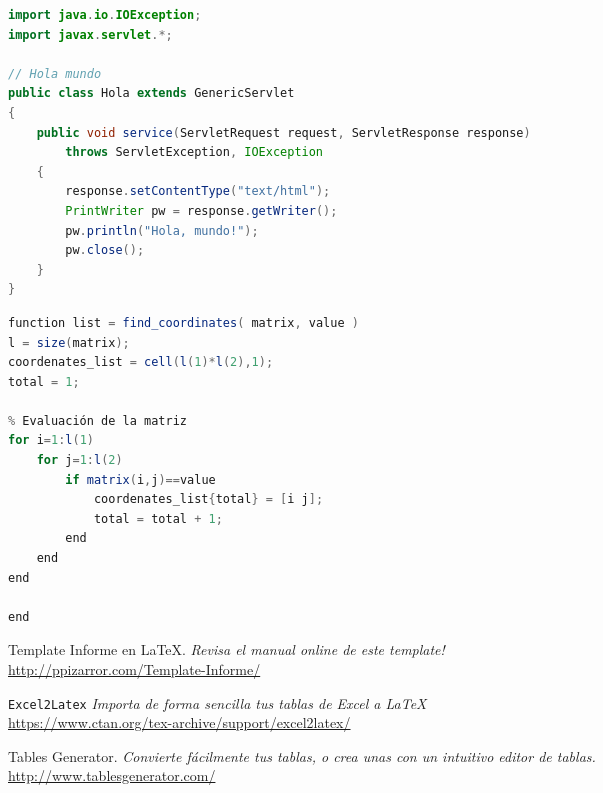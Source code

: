 \lstset{style=Java}
\begin{lstlisting}[language=Java, caption=Ejemplo en Java]
import java.io.IOException; 
import javax.servlet.*;

// Hola mundo
public class Hola extends GenericServlet 
{
    public void service(ServletRequest request, ServletResponse response)
        throws ServletException, IOException
    {
        response.setContentType("text/html");
        PrintWriter pw = response.getWriter();
        pw.println("Hola, mundo!");
        pw.close();
    }
}
\end{lstlisting}


\lstset{style=Matlab}
\begin{lstlisting}[language=Java, caption=Ejemplo en Matlab]
function list = find_coordinates( matrix, value )
l = size(matrix);
coordenates_list = cell(l(1)*l(2),1);
total = 1;

% Evaluación de la matriz
for i=1:l(1)
    for j=1:l(2)
        if matrix(i,j)==value
            coordenates_list{total} = [i j];
            total = total + 1;
        end
    end
end

end
\end{lstlisting}


\newpage
\begin{thebibliography}{99}
		
		 Template Informe en \LaTeX.
		\textit{Revisa el manual online de este template!}
		\\\url{http://ppizarror.com/Template-Informe/}
		
		 \texttt{Excel2Latex}
		\textit{Importa de forma sencilla tus tablas de Excel a \LaTeX}
		\\\url{https://www.ctan.org/tex-archive/support/excel2latex/}
		
		 Tables Generator.
		\textit{Convierte fácilmente tus tablas, o crea unas con un intuitivo editor de tablas.}
		\\\url{http://www.tablesgenerator.com/}
	
\end{thebibliography}